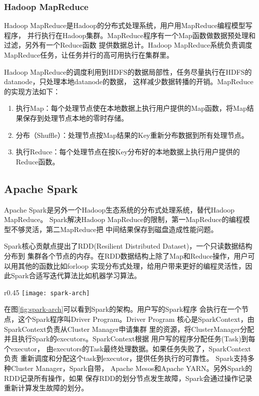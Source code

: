 \subsubsection{Hadoop MapReduce}
Hadoop MapReduce是Hadoop的分布式处理系统，用户用MapReduce编程模型写程序，
并行执行在Hadoop集群。MapReduce程序有一个Map函数做数据预处理和过滤，另外有一个Reduce函数
提供数据总计。Hadoop MapReduce系统负责调度MapReduce任务，让任务并行的高可用执行在集群里。

Hadoop MapReduce的调度利用到HDFS的数据局部性，任务尽量执行在HDFS的datanode，只处理本地datanode的数据，
这样减少数据转播的开销。MapReduce的实现方法如下：
\begin{enumerate}
  \item 执行Map：每个处理节点使在本地数据上执行用户提供的Map函数，将Map结果保存到处理节点本地的零时存储。
  \item 分布（Shuffle）：处理节点按Map结果的Key重新分布数据到所有处理节点。
  \item 执行Reduce：每个处理节点在按Key分布好的本地数据上执行用户提供的Reduce函数。
\end{enumerate}

\subsection{Apache Spark}
\label{subsubsec:spark}
Apache Spark是另外一个Hadoop生态系统的分布式处理系统，替代Hadoop MapReduce。
Spark解决Hadoop MapReduce的限制，第一MapReduce的编程模型不够灵活，第二MapReduce把
中间结果保存到磁盘造成性能问题。

Spark核心贡献点提出了RDD(Resilient Distributed Dataset)，一个只读数据结构分布到
集群各个节点的内存。在RDD数据结构上除了Map和Reduce操作，用户可以用其他的函数比如forloop
实现分布式处理，给用户带来更好的编程灵活性，因此Spark合适写迭代算法比如机器学习算法。

\begin{wrapfigure}{r}{0.45\textwidth}
  \centering
    \texttt{[image: spark-arch]}
    \caption{Spark集群的架构。源：\cite{spark_arch_doc}}
  \label{fig:spark-arch}
\end{wrapfigure}
在图\ref{fig:spark-arch}可以看到Spark的架构。用户写的Spark程序
会执行在一个节点，这个Spark程序叫Driver Program。Driver Program
核心是SparkContext，由SparkContext负责从Cluster Manager申请集群
里的资源，将ClusterManager分配并且执行Spark的executors。SparkContext根据
用户写的程序分配任务(Task)到每个executor，
由executors的Task最终处理数据。如果任务失败了，SparkContext负责
重新调度和分配这个task到executor，提供任务执行的可靠性。
Spark支持多种Cluster Manager，Spark自带，
Apache Mesos和Apache YARN。另外Spark的RDD记录所有操作，如果
保存RDD的划分节点发生故障，Spark会通过操作记录重新计算发生故障的划分。



